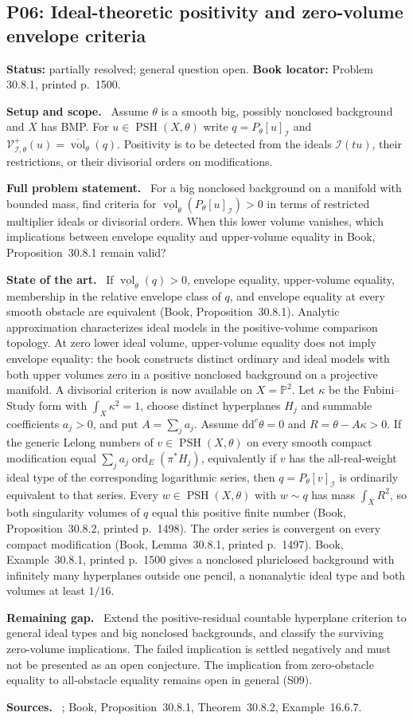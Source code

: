 \documentclass[11pt]{article}
\newcommand{\ddc}{\mathrm d\mathrm d^c}
\newcommand{\PSH}{\operatorname{PSH}}
\newcommand{\field}[1]{\par\medskip\noindent\textbf{#1.}\ }
\begin{document}
\subsection{P06: Ideal-theoretic positivity and zero-volume envelope criteria}
\label{P06}
\noindent\textbf{Status:} partially resolved; general question open. \textbf{Book locator:} Problem 30.8.1, printed p.~1500.
\field{Setup and scope} Assume $\theta$ is a smooth big, possibly nonclosed background and $X$ has BMP. For $u\in\PSH(X,\theta)$ write $q=P_\theta[u]_{\mathcal I}$ and $\mathcal V^+_{\mathcal I,\theta}(u)=\overline{\operatorname{vol}}_\theta(q)$. Positivity is to be detected from the ideals $\mathcal I(tu)$, their restrictions, or their divisorial orders on modifications.
\field{Full problem statement} For a big nonclosed background on a manifold with bounded mass, find criteria for $\underline{\operatorname{vol}}_\theta(P_\theta[u]_{\mathcal I})>0$ in terms of restricted multiplier ideals or divisorial orders. When this lower volume vanishes, which implications between envelope equality and upper-volume equality in Book, Proposition~30.8.1 remain valid?
\field{State of the art} If $\underline{\operatorname{vol}}_\theta(q)>0$, envelope equality, upper-volume equality, membership in the relative envelope class of $q$, and envelope equality at every smooth obstacle are equivalent (Book, Proposition~30.8.1). Analytic approximation characterizes ideal models in the positive-volume comparison topology. At zero lower ideal volume, upper-volume equality does not imply envelope equality: the book constructs distinct ordinary and ideal models with both upper volumes zero in a positive nonclosed background on a projective manifold.
 A divisorial criterion is now available on $X=\mathbb P^2$. Let $\kappa$ be the Fubini--Study form with $\int_X\kappa^2=1$, choose distinct hyperplanes $H_j$ and summable coefficients $a_j>0$, and put $A=\sum_ja_j$. Assume $\ddc\theta=0$ and $R=\theta-A\kappa>0$. If the generic Lelong numbers of $v\in\PSH(X,\theta)$ on every smooth compact modification equal $\sum_ja_j\operatorname{ord}_E(\pi^*H_j)$, equivalently if $v$ has the all-real-weight ideal type of the corresponding logarithmic series, then $q=P_\theta[v]_{\mathcal I}$ is ordinarily equivalent to that series. Every $w\in\PSH(X,\theta)$ with $w\sim q$ has mass $\int_XR^2$, so both singularity volumes of $q$ equal this positive finite number (Book, Proposition~30.8.2, printed p.~1498). The order series is convergent on every compact modification (Book, Lemma~30.8.1, printed p.~1497). Book, Example~30.8.1, printed p.~1500 gives a nonclosed pluriclosed background with infinitely many hyperplanes outside one pencil, a nonanalytic ideal type and both volumes at least $1/16$.
\field{Remaining gap} Extend the positive-residual countable hyperplane criterion to general ideal types and big nonclosed backgrounds, and classify the surviving zero-volume implications. The failed implication is settled negatively and must not be presented as an open conjecture. The implication from zero-obstacle equality to all-obstacle equality remains open in general (S09).
\field{Sources} \cite{SGPT,XL26,DX22,WN19}; Book, Proposition~30.8.1, Theorem~30.8.2, Example~16.6.7.
\end{document}
